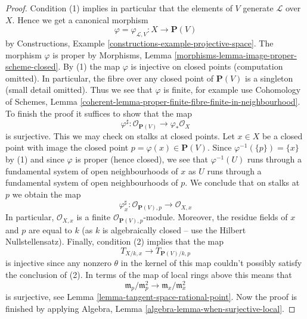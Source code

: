 \documentclass[10pt,a4paper]{amsart}
\theoremstyle{plain}
\theoremstyle{definition}
\theoremstyle{remark}
\numberwithin{equation}{subsection}
\begin{document}
\begin{proof}
Condition (1) implies in particular that the elements of $V$ generate
$\mathcal{L}$ over $X$. Hence we get a canonical morphism
$$
\varphi = \varphi_{\mathcal{L}, V} :
X
\longrightarrow
\mathbf{P}(V)
$$
by Constructions, Example \ref{constructions-example-projective-space}.
The morphism $\varphi$ is proper by
Morphisms, Lemma \ref{morphisms-lemma-image-proper-scheme-closed}.
By (1) the map $\varphi$ is injective on closed points
(computation omitted).
In particular, the fibre over any closed point of $\mathbf{P}(V)$
is a singleton (small detail omitted). Thus we see that
$\varphi$ is finite, for example use Cohomology of Schemes, Lemma
\ref{coherent-lemma-proper-finite-fibre-finite-in-neighbourhood}.
To finish the proof it suffices to show that the map
$$
\varphi^\sharp :
\mathcal{O}_{\mathbf{P}(V)}
\longrightarrow
\varphi_*\mathcal{O}_X
$$
is surjective. This we may check on stalks at closed points.
Let $x \in X$ be a closed point with image the closed
point $p = \varphi(x) \in \mathbf{P}(V)$. Since
$\varphi^{-1}(\{p\}) = \{x\}$ by (1) and since $\varphi$
is proper (hence closed), we see that $\varphi^{-1}(U)$
runs through a fundamental system of open neighbourhoods
of $x$ as $U$ runs through a fundamental system of open neighbourhoods of $p$.
We conclude that on stalks at $p$ we obtain the map
$$
\varphi^\sharp_x :
\mathcal{O}_{\mathbf{P}(V), p}
\longrightarrow
\mathcal{O}_{X, x}
$$
In particular, $\mathcal{O}_{X, x}$ is a finite
$\mathcal{O}_{\mathbf{P}(V), p}$-module.
Moreover, the residue fields of $x$ and $p$ are equal to $k$
(as $k$ is algebraically closed -- use the Hilbert Nullstellensatz).
Finally, condition (2) implies that the map
$$
T_{X/k, x} \longrightarrow T_{\mathbf{P}(V)/k, p}
$$
is injective since any nonzero $\theta$ in the kernel of this map
couldn't possibly satisfy the conclusion of (2).
In terms of the map of local rings above this means that
$$
\mathfrak m_p/\mathfrak m_p^2 \longrightarrow
\mathfrak m_x/\mathfrak m_x^2
$$
is surjective, see Lemma \ref{lemma-tangent-space-rational-point}.
Now the proof is finished by applying
Algebra, Lemma \ref{algebra-lemma-when-surjective-local}.
\end{proof}
\end{document}
